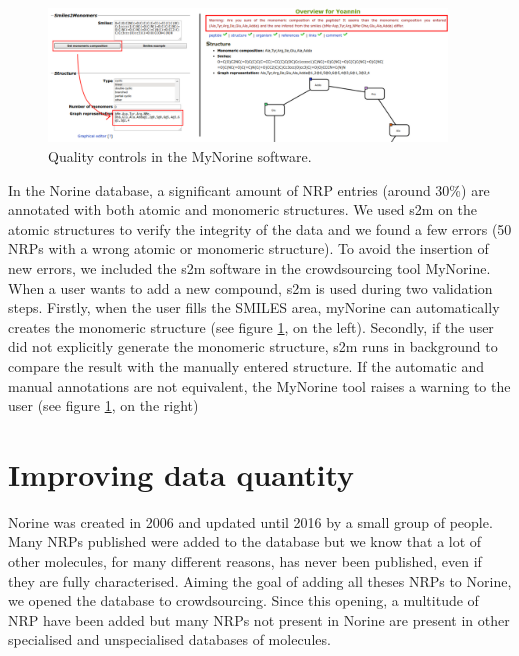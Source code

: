\documentclass[long, final]{jobim2017}
\begin{document}
 \begin{figure}
   \begin{center}
     \includegraphics[width=400px]{figs/warnings.png}
   \end{center}
   \caption{Quality controls in the MyNorine software.}
   \label{fig:warnings}
 \end{figure}

In the Norine database, a significant amount of NRP entries (around 30\%) are annotated with both atomic and monomeric structures.
We used s2m on the atomic structures to verify the integrity of the data and we found a few errors (50 NRPs with a wrong atomic or monomeric structure).
To avoid the insertion of new errors, we included the s2m software in the crowdsourcing tool MyNorine.
When a user wants to add a new compound, s2m is used during two validation steps.
Firstly, when the user fills the SMILES area, myNorine can automatically creates the monomeric structure (see figure \ref{fig:warnings}, on the left).
Secondly, if the user did not explicitly generate the monomeric structure, s2m runs in background to compare the result with the manually entered structure.
If the automatic and manual annotations are not equivalent, the MyNorine tool raises a warning to the user (see figure \ref{fig:warnings}, on the right)


\section{Improving data quantity}

Norine was created in 2006 and updated until 2016 by a small group of people.
Many NRPs published were added to the database but we know that a lot of other molecules, for many different reasons, has never been published, even if they are fully characterised.
Aiming the goal of adding all theses NRPs to Norine, we opened the database to crowdsourcing.
Since this opening, a multitude of NRP have been added but many NRPs not present in Norine are present in other specialised and unspecialised databases of molecules.
\end{document}
